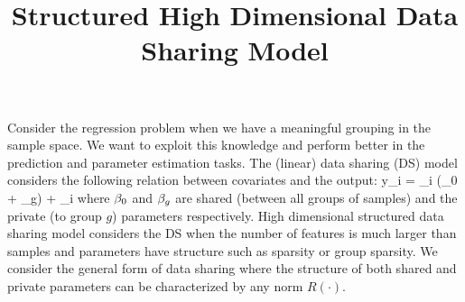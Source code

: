 \documentclass[]{article}
\title{Structured High Dimensional Data Sharing Model}
\author{}
\begin{document}
	
		\maketitle 
		Consider the regression problem when we have a meaningful grouping in the sample space. 
		We want to exploit this knowledge and perform better in the prediction and parameter estimation tasks. 
		The (linear) data sharing (DS) model considers the following relation between covariates and the output:
		\be 
		y_i = \x_i (\bbeta_0 + \bbeta_g) + \epsilon_i 
		\ee 
		where ${\beta}_0$ and ${\beta}_g$ are shared (between all groups of samples) and the private (to group $g$) parameters respectively. 
		High dimensional structured data sharing model considers the DS when the number of features is much larger than samples and parameters have structure such as sparsity or group sparsity.
		We consider the general form of data sharing where the structure of both shared and private parameters can be characterized by any norm $R(\cdot)$. 		
\end{document}
